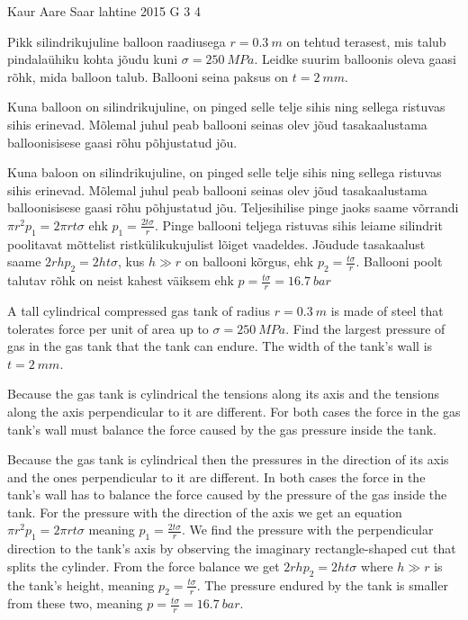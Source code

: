{Kaur Aare Saar} %
{lahtine} %
{2015} %
{G 3} %
{4} %
{
\ifStatement
Pikk silindrikujuline balloon raadiusega $r=\SI{0,3}{m}$ on tehtud terasest, mis talub pindalaühiku kohta jõudu kuni $\sigma=\SI{250}{MPa}$. Leidke suurim balloonis oleva gaasi rõhk, mida balloon talub. Ballooni seina paksus on $t=\SI{2}{mm}$.
\fi


\ifHint
Kuna balloon on silindrikujuline, on pinged selle telje sihis ning sellega ristuvas sihis erinevad. Mõlemal juhul peab ballooni seinas olev jõud tasakaalustama balloonisisese gaasi rõhu põhjustatud jõu.
\fi


\ifSolution
Kuna baloon on silindrikujuline, on pinged selle telje sihis ning sellega ristuvas sihis erinevad. Mõlemal juhul peab ballooni seinas olev jõud tasakaalustama balloonisisese gaasi rõhu põhjustatud jõu. Teljesihilise pinge jaoks saame võrrandi $\pi r^2 p_1=2\pi rt\sigma$ ehk $p_1=\frac{2t\sigma}{r}$. Pinge ballooni teljega ristuvas sihis leiame silindrit poolitavat mõttelist ristkülikukujulist lõiget vaadeldes. Jõudude tasakaalust saame $2rhp_2=2ht\sigma$, kus $h\gg r$ on ballooni kõrgus, ehk $p_2=\frac{t\sigma}{r}$. Ballooni poolt talutav rõhk on neist kahest väiksem ehk $p=\frac{t\sigma}{r}=\SI{16,7}{bar}$
\fi


\ifEngStatement
A tall cylindrical compressed gas tank of radius $r=\SI{0,3}{m}$ is made of steel that tolerates force per unit of area up to $\sigma=\SI{250}{MPa}$. Find the largest pressure of gas in the gas tank that the tank can endure. The width of the tank’s wall is $t=\SI{2}{mm}$.
\fi


\ifEngHint
Because the gas tank is cylindrical the tensions along its axis and the tensions along the axis perpendicular to it are different. For both cases the force in the gas tank’s wall must balance the force caused by the gas pressure inside the tank.
\fi


\ifEngSolution
Because the gas tank is cylindrical then the pressures in the direction of its axis and the ones perpendicular to it are different. In both cases the force in the tank’s wall has to balance the force caused by the pressure of the gas inside the tank. For the pressure with the direction of the axis we get an equation $\pi r^2 p_1=2\pi rt\sigma$ meaning $p_1=\frac{2t\sigma}{r}$. We find the pressure with the perpendicular direction to the tank’s axis by observing the imaginary rectangle-shaped cut that splits the cylinder. From the force balance we get $2rhp_2=2ht\sigma$ where $h\gg r$ is the tank’s height, meaning $p_2=\frac{t\sigma}{r}$. The pressure endured by the tank is smaller from these two, meaning $p=\frac{t\sigma}{r}=\SI{16,7}{bar}$.
\fi
}